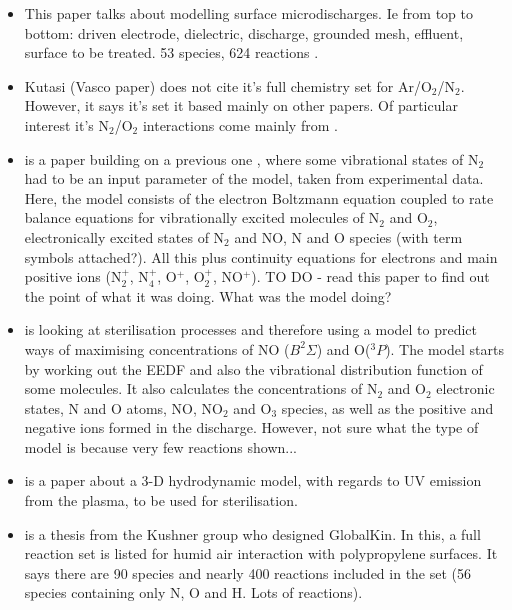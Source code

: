 \documentclass[11pt, oneside]{article}   	%
\begin{document}
\begin{itemize}
\item This paper talks about modelling surface microdischarges. Ie from top to bottom: driven electrode, dielectric, discharge, grounded mesh, effluent, surface to be treated. 53 species, 624 reactions \cite{Sakiyama2012plasma}.
\item Kutasi \cite{Kutasi2016tuning}(Vasco paper) does not cite it's full chemistry set for Ar/O$_2$/N$_2$. However, it says it's set it based mainly on other papers. Of particular interest it's N$_2$/O$_2$ interactions come mainly from \cite{Pintassilgo2005modelling, Guerra1997self, Kutasi2008modelling}.
\item \cite{Guerra1997self} is a paper building on a previous one \cite{Guerra1995non}, where some vibrational states of N$_2$ had to be an input parameter of the model, taken from experimental data. Here, the model consists of the electron Boltzmann equation coupled to rate balance equations for vibrationally excited molecules of N$_2$ and O$_2$, electronically excited states of N$_2$ and NO, N and O species (with term symbols attached?). All this plus continuity equations for electrons and main positive ions (N$_2^+$, N$_4^+$, O$^+$, O$_2^+$, NO$^+$). TO DO - read this paper to find out the point of what it was doing. What was the model doing? 
\item \cite{Pintassilgo2005modelling} is looking at sterilisation processes and therefore using a model to predict ways of maximising concentrations of NO ($B ^2\Sigma$) and O($^3P$). 
The model starts by working out the EEDF and also the vibrational distribution function of some molecules. 
It also calculates the concentrations of N$_2$ and O$_2$ electronic states, N and O atoms, NO, NO$_2$ and O$_3$ species, as well as the positive and negative ions formed in the discharge. However, not sure what the type of model is because very few reactions shown...
\item \cite{Kutasi2008modelling} is a paper about a 3-D hydrodynamic model, with regards to UV emission from the plasma, to be used for sterilisation.

\item \cite{Dorai2002modeling} is a thesis from the Kushner group who designed GlobalKin. 
In this, a full reaction set is listed for humid air interaction with polypropylene surfaces.
It says there are 90 species and nearly 400 reactions included in the set (56 species containing only N, O and H. Lots of reactions).


\end{itemize}
\end{document}
